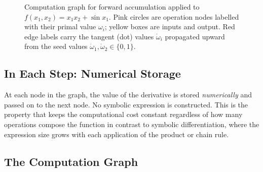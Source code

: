 \documentclass[12pt, a4paper]{article}
\begin{document}
\begin{figure}[h]
\caption{Computation graph for forward accumulation applied to
  $f(x_1, x_2) = x_1 x_2 + \sin x_1$.
  Pink circles are operation nodes labelled with their primal value $\omega_i$;
  yellow boxes are inputs and output.
  Red edge labels carry the tangent (dot) values $\dot\omega_i$ propagated
  upward from the seed values $\dot\omega_1, \dot\omega_2 \in \{0,1\}$.}
\label{fig:ad_graph}
\end{figure}
\subsection{In Each Step: Numerical Storage}

At each node in the graph, the value of the derivative is stored
\emph{numerically} and passed on to the next node.
No symbolic expression is constructed.
This is the property that keeps the computational cost constant regardless
of how many operations compose the function in contrast to symbolic
differentiation, where the expression size grows with each application of the
product or chain rule.

\subsection{The Computation Graph}
\label{sec:compgraph}
\end{document}
